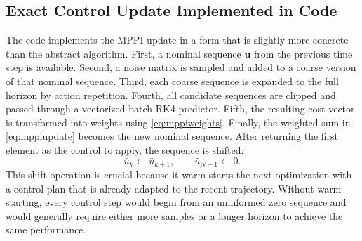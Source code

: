 \documentclass[conference]{IEEEtran}
\begin{document}
\subsection{Exact Control Update Implemented in Code}
The code implements the MPPI update in a form that is slightly more concrete than the abstract algorithm. First, a nominal sequence $\bar{\bm{u}}$ from the previous time step is available. Second, a noise matrix is sampled and added to a coarse version of that nominal sequence. Third, each coarse sequence is expanded to the full horizon by action repetition. Fourth, all candidate sequences are clipped and passed through a vectorized batch RK4 predictor. Fifth, the resulting cost vector is transformed into weights using \eqref{eq:mppiweights}. Finally, the weighted sum in \eqref{eq:mppiupdate} becomes the new nominal sequence. After returning the first element as the control to apply, the sequence is shifted:
\begin{equation}
\bar{u}_k \leftarrow \bar{u}_{k+1}, \qquad
\bar{u}_{N-1} \leftarrow 0.
\end{equation}
This shift operation is crucial because it warm-starts the next optimization with a control plan that is already adapted to the recent trajectory. Without warm starting, every control step would begin from an uninformed zero sequence and would generally require either more samples or a longer horizon to achieve the same performance.
\end{document}
